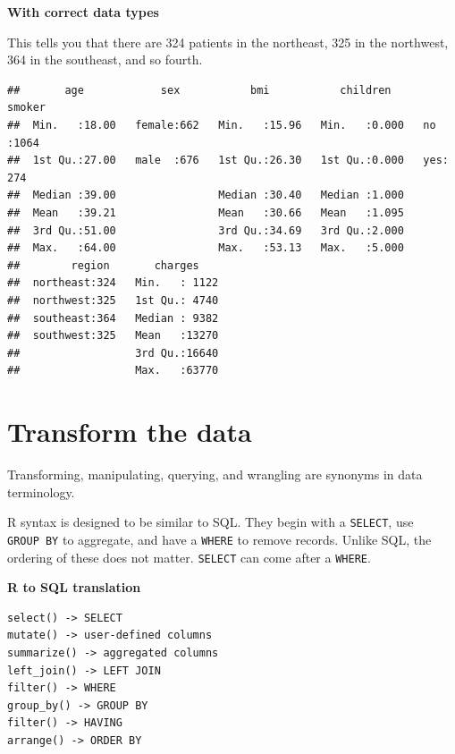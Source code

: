 \documentclass[openany]{book}
\newenvironment{Shaded}{\begin{snugshade}}{\end{snugshade}}
\newcommand{\KeywordTok}[1]{\textcolor[rgb]{0.13,0.29,0.53}{\textbf{#1}}}
\newcommand{\NormalTok}[1]{#1}
\newcommand{\OperatorTok}[1]{\textcolor[rgb]{0.81,0.36,0.00}{\textbf{#1}}}
\newcommand{\StringTok}[1]{\textcolor[rgb]{0.31,0.60,0.02}{#1}}
\begin{document}
\textbf{With correct data types}

This tells you that there are 324 patients in the northeast, 325 in the northwest, 364 in the southeast, and so fourth.

\begin{Shaded}
\end{Shaded}

\begin{verbatim}
##       age            sex           bmi           children     smoker    
##  Min.   :18.00   female:662   Min.   :15.96   Min.   :0.000   no :1064  
##  1st Qu.:27.00   male  :676   1st Qu.:26.30   1st Qu.:0.000   yes: 274  
##  Median :39.00                Median :30.40   Median :1.000             
##  Mean   :39.21                Mean   :30.66   Mean   :1.095             
##  3rd Qu.:51.00                3rd Qu.:34.69   3rd Qu.:2.000             
##  Max.   :64.00                Max.   :53.13   Max.   :5.000             
##        region       charges     
##  northeast:324   Min.   : 1122  
##  northwest:325   1st Qu.: 4740  
##  southeast:364   Median : 9382  
##  southwest:325   Mean   :13270  
##                  3rd Qu.:16640  
##                  Max.   :63770
\end{verbatim}

\hypertarget{transform-the-data}{%
\section{Transform the data}\label{transform-the-data}}

Transforming, manipulating, querying, and wrangling are synonyms in data terminology.

R syntax is designed to be similar to SQL. They begin with a \texttt{SELECT}, use \texttt{GROUP\ BY} to aggregate, and have a \texttt{WHERE} to remove records. Unlike SQL, the ordering of these does not matter. \texttt{SELECT} can come after a \texttt{WHERE}.

\textbf{R to SQL translation}

\begin{verbatim}
select() -> SELECT
mutate() -> user-defined columns
summarize() -> aggregated columns
left_join() -> LEFT JOIN
filter() -> WHERE
group_by() -> GROUP BY
filter() -> HAVING
arrange() -> ORDER BY
\end{verbatim}
\end{document}
